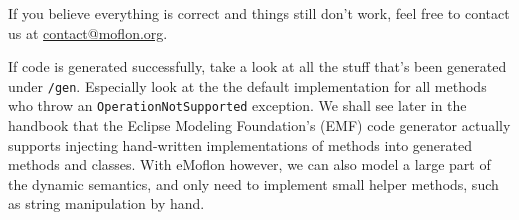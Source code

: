 If you believe everything is correct and things still don't work, feel free to contact us at \href{mailto:contact@moflon.org}{contact@moflon.org}.

If code is generated successfully, take a look at all the stuff that's been generated under \texttt{/gen}. Especially look at the the default implementation for
all methods who throw an  \texttt{OperationNotSupported} exception. We shall see later in the handbook that the Eclipse Modeling Foundation's (EMF) code
generator actually supports injecting hand-written implementations of methods into generated methods and classes. With eMoflon however, we can also model a
large part of the dynamic semantics, and only need to implement small helper methods, such as string manipulation by hand.

